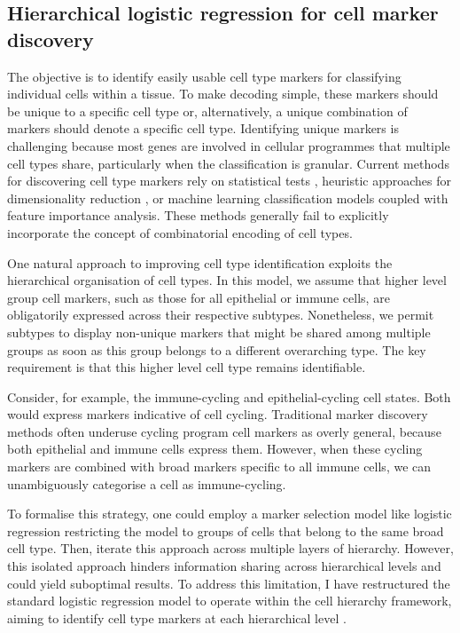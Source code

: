 \subsection{Hierarchical logistic regression for cell marker discovery}
\label{sec:modalities-schierarchy}


The objective is to identify easily usable cell type markers for classifying individual cells within a tissue. To make decoding simple, these markers should be unique to a specific cell type or, alternatively, a unique combination of markers should denote a specific cell type. Identifying unique markers is challenging because most genes are involved in cellular programmes that multiple cell types share, particularly when the classification is granular. Current methods for discovering cell type markers rely on statistical tests \parencite{Wolf2018-kx}, heuristic approaches for dimensionality reduction \parencite{Dumitrascu2021-dg, Dai2022-ve, Missarova2021-vg}, or machine learning classification models \parencite{Nelson2022-vg} coupled with feature importance analysis. These methods generally fail to explicitly incorporate the concept of combinatorial encoding of cell types.

One natural approach to improving cell type identification exploits the hierarchical organisation of cell types. In this model, we assume that higher level group cell markers, such as those for all epithelial or immune cells, are obligatorily expressed across their respective subtypes. Nonetheless, we permit subtypes to display non-unique markers that might be shared among multiple groups as soon as this group belongs to a different overarching type. The key requirement is that this higher level cell type remains identifiable.

Consider, for example, the immune-cycling and epithelial-cycling cell states. Both would express markers indicative of cell cycling. Traditional marker discovery methods often underuse cycling program cell markers as overly general, because both epithelial and immune cells express them. However, when these cycling markers are combined with broad markers specific to all immune cells, we can unambiguously categorise a cell as immune-cycling.

To formalise this strategy, one could employ a marker selection model like logistic regression restricting the model to groups of cells that belong to the same broad cell type. Then, iterate this approach across multiple layers of hierarchy. However, this isolated approach hinders information sharing across hierarchical levels and could yield suboptimal results. To address this limitation, I have restructured the standard logistic regression model to operate within the cell hierarchy framework, aiming to identify cell type markers at each hierarchical level .

